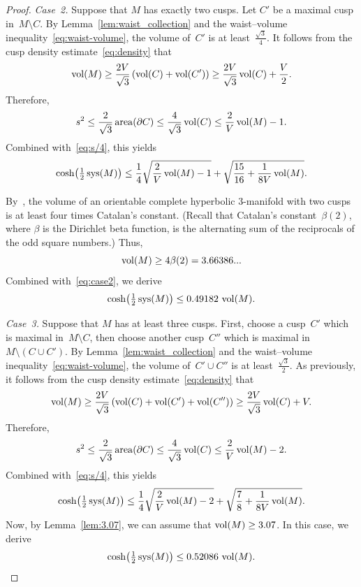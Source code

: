 \documentclass[11pt,reqno]{amsart}
\theoremstyle{definition}
\numberwithin{equation}{section}
\DeclareMathOperator{\area}{{\rm area}}
\DeclareMathOperator{\vol}{{\rm vol}}
\DeclareMathOperator{\sys}{{\rm sys}}
\numberwithin{equation}{section}
\begin{document}
\begin{proof}
\medskip

\emph{Case~2.} 
Suppose that $M$ has exactly two cusps.
Let $C'$ be a maximal cusp in~$M \setminus C$.
By Lemma~\ref{lem:waist_collection} and the waist--volume inequality~\eqref{eq:waist-volume}, the volume of~$C'$ is at least~$\frac{\sqrt{3}}{4}$.
It follows from the cusp density estimate~\eqref{eq:density} that
\[
\vol(M) \geq \frac{2V}{\sqrt{3}} \left( \vol(C) + \vol(C') \right) \geq \frac{2V}{\sqrt{3}} \vol(C) + \frac{V}{2}.
\]
Therefore,
\[
s^2 \leq \frac{2}{\sqrt{3}} \area(\partial C) \leq \frac{4}{\sqrt{3}} \vol(C) \leq \frac{2}{V} \vol(M) -1.
\]
Combined with~\eqref{eq:s/4}, this yields
\begin{equation} \label{eq:case2}
\cosh \!\left(\tfrac{1}{2} \sys(M) \right) \leq \frac{1}{4} \sqrt{\frac{2}{V} \vol(M) -1} + \sqrt{\frac{15}{16} + \frac{1}{8V} \vol(M)}.
\end{equation}

By~\cite{agol_2cusps}, the volume of an orientable complete hyperbolic $3$-manifold with two cusps is at least four times Catalan's constant.
(Recall that Catalan's constant~$\beta(2)$, where $\beta$ is the Dirichlet beta function, is the alternating sum of the reciprocals of the odd square numbers.)
Thus, 
\[
\vol(M) \geq 4 \beta(2) = 3.66386...
\]
Combined with~\eqref{eq:case2}, we derive
\[
\cosh \!\left(\tfrac{1}{2} \sys(M) \right) \leq 0.49182 \, \vol(M).
\]

\medskip

\emph{Case~3.} 
Suppose that $M$ has at least three cusps.
First, choose a cusp~$C'$ which is maximal in~$M \setminus C$, then choose another cusp~$C''$ which is maximal in~$M \setminus (C \cup C')$.
By Lemma~\ref{lem:waist_collection} and the waist--volume inequality~\eqref{eq:waist-volume}, the volume of~$C' \cup C''$ is at least~$\frac{\sqrt{3}}{2}$.
As previously, it follows from the cusp density estimate~\eqref{eq:density} that
\[
\vol(M) \geq \frac{2V}{\sqrt{3}} \left( \vol(C) + \vol(C') + \vol(C'') \right) \geq \frac{2V}{\sqrt{3}} \vol(C) + V.
\]
Therefore,
\[
s^2 \leq \frac{2}{\sqrt{3}} \area(\partial C) \leq \frac{4}{\sqrt{3}} \vol(C) \leq \frac{2}{V} \vol(M) -2.
\]
Combined with~\eqref{eq:s/4}, this yields
\[
\cosh \!\left(\tfrac{1}{2} \sys(M) \right) \leq \frac{1}{4} \sqrt{\frac{2}{V} \vol(M) -2} + \sqrt{\frac{7}{8} + \frac{1}{8V} \vol(M)}.
\]
Now, by Lemma~\ref{lem:3.07}, we can assume that $\vol(M) \geq 3.07$.
In this case, we derive
\[
\cosh \!\left(\tfrac{1}{2} \sys(M) \right) \leq 0.52086 \, \vol(M).
\]
\end{proof}
\end{document}
